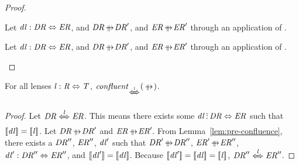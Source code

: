 \documentclass[numbers,10pt,preprint\ifanon ,nocopyrightspace\fi]{sigplanconf}
\begin{document}
\begin{proof}
  \begin{case}[\ParallelDNFStructuralRewriteRule{}]
    Let $\mathit{dl} : \mathit{DR} \Leftrightarrow \mathit{ER}$, and
    $\DNFRegex\ParallelRewrite\DNFRegex'$, and $\DNFRegexAlt\ParallelRewrite\DNFRegexAlt'$
    through an application of \ParallelDNFStructuralRewriteRule{}.
  \end{case}
  
  \begin{case}[\IdentityRewriteRule{}]
    Let $\mathit{dl} : \mathit{DR} \Leftrightarrow \mathit{ER}$, and
    $\DNFRegex\ParallelRewrite\DNFRegex'$, and $\DNFRegexAlt\ParallelRewrite\DNFRegexAlt'$
    through an application of \IdentityRewriteRule{}.
  \end{case}
\end{proof}

\begin{theorem}
  \label{thm:parallel_confluence_noswap}
  For all lenses $\mathit{l} : \mathit{R} \Leftrightarrow \mathit{T}$,
  $\IsConfluentWithPropertyOf{\ParallelRewrite}{\DNFLensHasSemanticsOf{\Lens}}$.
\end{theorem}
\begin{proof}
  Let $\DNFRegex \DNFLensHasSemanticsOf{\Lens} \DNFRegexAlt$.
  This means there exists some $\mathit{dl} \,\tilde{:}\, \mathit{DR}
  \Leftrightarrow \mathit{ER}$ such that $[ \! [\mathit{dl}] \! ] =
  [ \! [\mathit{l}] \! ]$.
  Let $\DNFRegex \ParallelRewrite \DNFRegex'$ and $\DNFRegexAlt \ParallelRewrite
  \DNFRegexAlt'$.  From Lemma~\ref{lem:pre-confluence}, there exists a
  $\mathit{DR}''$, $\mathit{ER}''$, $\mathit{dl}'$ such that $\DNFRegex'
  \ParallelRewrite
  \DNFRegex''$, $\DNFRegexAlt' \ParallelRewrite \DNFRegexAlt''$, $\mathit{dl}'
  :
  \mathit{DR}'' \Leftrightarrow \mathit{ER}''$, and $[ \! [\mathit{dl}'] \! ] =
  [ \! [\mathit{dl}] \! ]$.  Because $[ \! [\mathit{dl}'] \! ] =
  [ \! [\mathit{dl}] \! ] = [ \! [\mathit{l}] \! ]$, $\DNFRegex''
  \DNFLensHasSemanticsOf{\Lens} \DNFRegexAlt''$.
\end{proof}
\end{document}
